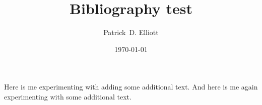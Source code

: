 \documentclass[a4paper,12pt]{article}
\title{Bibliography test}
\author{Patrick~D. Elliott}
\date{\today}
\begin{document}
\maketitle

Here is me experimenting with adding some additional text. And here is me again experimenting with some additional text.

\nocite{*}

\printbibliography
\end{document}
